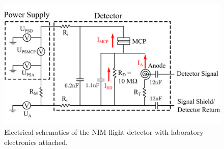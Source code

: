 	\begin{figure}[h] %
		\centering
		\includegraphics[width = \textwidth]{Bilder/Detector_elec_schema.png}
		\caption{Electrical schematics of the NIM flight detector with laboratory electronics attached.}
		\label{fig:FlighElecSchema}
	\end{figure}
